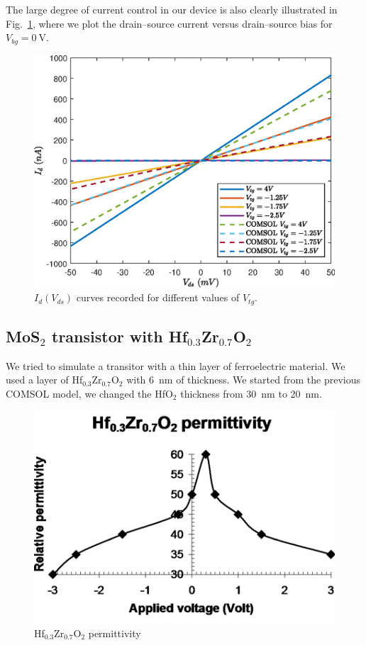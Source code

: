 \documentclass[electronics,article,submit,moreauthors,pdftex]{Definitions/mdpi}
\begin{document}
The large degree of current control in our device is also clearly illustrated in Fig.~\ref{fig:Id(Vds)_HfO2_MoS2_varying_Vtg}, where we plot the drain–source current versus drain–source bias for $V_{bg}=\SI{0}{\volt}$.

\begin{figure}[H]
	\centering
	\includegraphics[width=.7\textwidth]{Grafici/Id(Vds)_HfO2_MoS2_varying_Vtg.eps} 
	\caption{$I_d(V_{ds})$ curves recorded for different values of $V_{tg}$.}
	\label{fig:Id(Vds)_HfO2_MoS2_varying_Vtg}
\end{figure} 

\subsection{MoS$_2$ transistor with Hf$_{0.3}$Zr$_{0.7}$O$_2$}
\label{zirconium}
We tried to simulate a transitor with a thin layer of ferroelectric material. We used a layer of Hf$_{0.3}$Zr$_{0.7}$O$_2$ with \SI{6}{\nano \meter} of thickness. We started from the previous COMSOL model, we changed the HfO$_2$ thickness from \SI{30}{\nano \meter} to \SI{20}{\nano \meter}.

\begin{figure}[h]
	\centering
	\includegraphics[width=.6\textwidth]{Immagini/HfZrO2_permittivity.png} 
	\caption{Hf$_{0.3}$Zr$_{0.7}$O$_2$ permittivity~\cite{Dragoman:ferroelectric}}
	\label{fig:HfZrO2_permittivity}
\end{figure}
\end{document}
